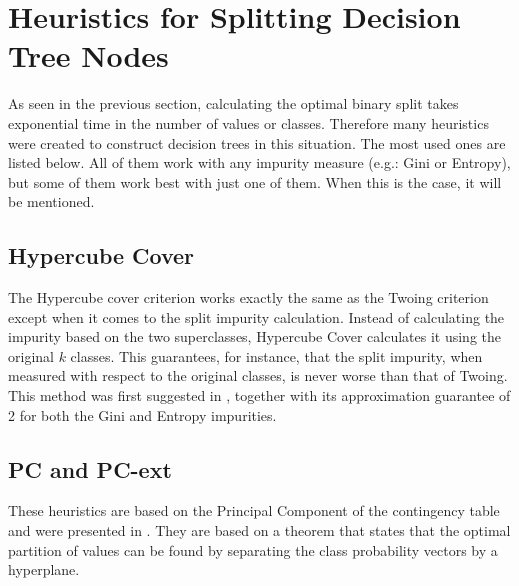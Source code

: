 \section{Heuristics for Splitting Decision Tree Nodes}
As seen in the previous section, calculating the optimal binary split takes exponential time in the number of values or classes. Therefore many heuristics were created to construct decision trees in this situation. The most used ones are listed below. All of them work with any impurity measure (e.g.: Gini or Entropy), but some of them work best with just one of them. When this is the case, it will be mentioned.

\subsection{Hypercube Cover}

The Hypercube cover criterion works exactly the same as the Twoing criterion except when it comes to the split impurity calculation. Instead of calculating the impurity based on the two superclasses, Hypercube Cover calculates it using the original $k$ classes. This guarantees, for instance, that the split impurity, when measured with respect to the original classes, is never worse than that of Twoing. This method was first suggested in \cite{icml2018}, together with its approximation guarantee of 2 for both the Gini and Entropy impurities.


%


\subsection{PC and PC-ext}
These heuristics are based on the Principal Component of the contingency table and were presented in \cite{journals/datamine/CoppersmithHH99}.
They are based on a theorem that states that the optimal partition of values can be found by separating the class probability vectors by a hyperplane.

